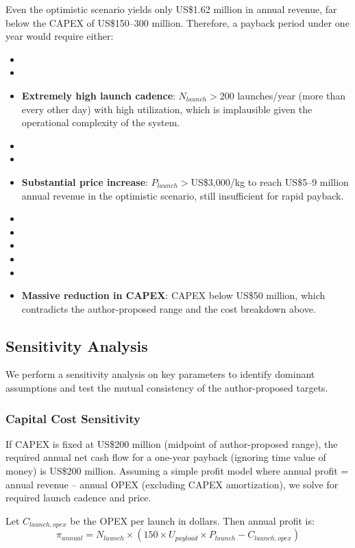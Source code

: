 Even the optimistic scenario yields only US\$1.62 million in annual revenue, far below the CAPEX of US\$150–300 million. Therefore, a payback period under one year would require either:
\begin{itemize}
    \item \item \item \textbf{Extremely high launch cadence}: $N_{launch} > 200$ launches/year (more than every other day) with high utilization, which is implausible given the operational complexity of the system.
    \item \item \item \textbf{Substantial price increase}: $P_{launch} > $US\$3,000/kg to reach US\$5–9 million annual revenue in the optimistic scenario, still insufficient for rapid payback.
    \item \item \item \item \item \item \textbf{Massive reduction in CAPEX}: CAPEX below US\$50 million, which contradicts the author-proposed range and the cost breakdown above.
\end{itemize}

\subsection{Sensitivity Analysis}
We perform a sensitivity analysis on key parameters to identify dominant assumptions and test the mutual consistency of the author-proposed targets.

\subsubsection{Capital Cost Sensitivity}
If CAPEX is fixed at US\$200 million (midpoint of author-proposed range), the required annual net cash flow for a one-year payback (ignoring time value of money) is US\$200 million. Assuming a simple profit model where annual profit = annual revenue – annual OPEX (excluding CAPEX amortization), we solve for required launch cadence and price.

Let $C_{launch,opex}$ be the OPEX per launch in dollars. Then annual profit is:
\begin{equation}
\pi_{annual} = N_{launch} \times (150 \times U_{payload} \times P_{launch} - C_{launch,opex})
\end{equation}

